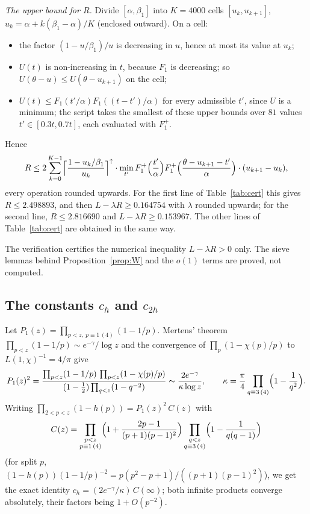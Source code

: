 \documentclass[11pt]{amsart}
\theoremstyle{remark}
\begin{document}
\emph{The upper bound for $R$.} Divide $[\alpha,\beta_1]$ into $K=4000$ cells $[u_k,u_{k+1}]$, $u_k=\alpha+k(\beta_1-\alpha)/K$ (enclosed outward). On a cell:
\begin{itemize}[leftmargin=2em]
\item the factor $(1-u/\beta_1)/u$ is decreasing in $u$, hence at most its value at $u_k$;
\item $U(t)$ is non-increasing in $t$, because $F_1$ is decreasing; so $U(\theta-u)\le U(\theta-u_{k+1})$ on the cell;
\item $U(t)\le F_1(t'/\alpha)F_1((t-t')/\alpha)$ for every admissible $t'$, since $U$ is a minimum; the script takes the smallest of these upper bounds over $81$ values $t'\in[0.3t,0.7t]$, each evaluated with $F_1^+$.
\end{itemize}
Hence
\[
R\le 2\sum_{k=0}^{K-1}\Bigl\lceil\frac{1-u_k/\beta_1}{u_k}\Bigr\rceil^\uparrow\cdot\min_{t'}F^+_1\Bigl(\frac{t'}{\alpha}\Bigr)F^+_1\Bigl(\frac{\theta-u_{k+1}-t'}{\alpha}\Bigr)\cdot(u_{k+1}-u_k),
\]
every operation rounded upwards. For the first line of Table~\ref{tab:cert} this gives $R\le2.498893$, and then $L-\lambda R\ge0.164754$ with $\lambda$ rounded upwards; for the second line, $R\le2.816690$ and $L-\lambda R\ge0.153967$. The other lines of Table~\ref{tab:cert} are obtained in the same way.

The verification certifies the numerical inequality $L-\lambda R>0$ only. The sieve lemmas behind Proposition~\ref{prop:W} and the $o(1)$ terms are proved, not computed.

\subsection{The constants $c_h$ and $c_{2h}$}\label{app:ch}
Let $P_1(z)=\prod_{p<z,\ p\equiv1\,(4)}(1-1/p)$. Mertens' theorem $\prod_{p<z}(1-1/p)\sim e^{-\gamma}/\log z$ and the convergence of $\prod_p(1-\chi(p)/p)$ to $L(1,\chi)^{-1}=4/\pi$ give
\[
P_1(z)^2=\frac{\prod_{p<z}(1-1/p)\,\prod_{p<z}(1-\chi(p)/p)}{(1-\frac12)\prod_{q<z}(1-q^{-2})}\sim\frac{2e^{-\gamma}}{\kappa\log z},\qquad
\kappa=\frac\pi4\prod_{q\equiv3\,(4)}\Bigl(1-\frac1{q^2}\Bigr).
\]
Writing $\prod_{2<p<z}(1-h(p))=P_1(z)^2\,C(z)$ with
\[
C(z)=\prod_{\substack{p<z\\ p\equiv1\,(4)}}\Bigl(1+\frac{2p-1}{(p+1)(p-1)^2}\Bigr)\prod_{\substack{q<z\\ q\equiv3\,(4)}}\Bigl(1-\frac1{q(q-1)}\Bigr)
\]
(for split $p$, $(1-h(p))(1-1/p)^{-2}=p(p^2-p+1)/((p+1)(p-1)^2)$), we get the exact identity $c_h=(2e^{-\gamma}/\kappa)\,C(\infty)$; both infinite products converge absolutely, their factors being $1+O(p^{-2})$.
\end{document}
